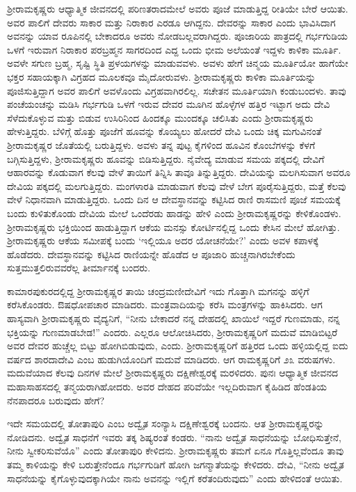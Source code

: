 ಶ‍್ರೀರಾಮಕೃಷ್ಣರು ಆಧ್ಯಾತ್ಮಿಕ ಜೀವನದಲ್ಲಿ ಪರಿಣತರಾದಮೇಲೆ ಅವರು ಪೂಜೆ ಮಾಡುತ್ತಿದ್ದ ರೀತಿಯೇ ಬೇರೆ ಆಯಿತು. ಅವರ ಪಾಲಿಗೆ ದೇವರು ಸಾಕಾರ ಮತ್ತು ನಿರಾಕಾರ ಎರಡೂ ಆಗಿದ್ದನು. ದೇವರನ್ನು ಸಾಕಾರ ಎಂದು ಭಾವಿಸಿದಾಗ ಅವನನ್ನು ಯಾವ ರೂಪಿನಲ್ಲಿ ಬೇಕಾದರೂ ಅವರು ನೋಡಬಲ್ಲವರಾಗಿದ್ದರು. ಪೂಜಾರಿಯ ಪಾತ್ರದಲ್ಲಿ ಗರ್ಭಗುಡಿಯ ಒಳಗೆ ಇರುವಾಗ ನಿರಾಕಾರ ಪರಬ್ರಹ್ಮನ ಸಾಗರದಿಂದ ಎದ್ದ ಒಂದು ಭೀಮ ಅಲೆಯಂತೆ ಇದ್ದಳು ಕಾಳಿಕಾ ಮೂರ್ತಿ. ಅವಳೇ ಸಗುಣ ಬ್ರಹ್ಮ, ಸೃಷ್ಟಿ ಸ್ಥಿತಿ ಪ್ರಳಯಗಳನ್ನು ಮಾಡುವವಳು. ಅವಳು ಹೇಗೆ ಚಿನ್ಮಯ ಮೂರ್ತಿಯೋ ಹಾಗೆಯೇ ಭಕ್ತರ ಸಹಾಯಕ್ಕಾಗಿ ವಿಗ್ರಹದ ಮೂಲಕವೂ ಮೈದೋರುವಳು. ಶ‍್ರೀರಾಮಕೃಷ್ಣರು ಕಾಳಿಕಾ ಮೂರ್ತಿಯನ್ನು ಪೂಜಿಸುತ್ತಿದ್ದಾಗ ಅವರ ಪಾಲಿಗೆ ಅವಳೊಂದು ವಿಗ್ರಹವಾಗಿರಲಿಲ್ಲ. ಸಚೇತನ ಮೂರ್ತಿಯಾಗಿ ಕಂಡುಬಂದಳು. ತಾವು ಪಂಚೆಯಂಚನ್ನು ಮಡಿಸಿ ಗರ್ಭಗುಡಿ ಒಳಗೆ ಇರುವ ದೇವರ ಮೂಗಿನ ಹೊಳ್ಳೆಗಳ ಹತ್ತಿರ ಇಟ್ಟಾಗ ಅದು ದೇವಿ ಸೆಳೆದುಕೊಳ್ಳುವ ಮತ್ತು ಬಿಡುವ ಉಸಿರಿನಿಂದ ಹಿಂದಕ್ಕೂ ಮುಂದಕ್ಕೂ ಚಲಿಸಿತು ಎಂದು ಶ‍್ರೀರಾಮಕೃಷ್ಣರು ಹೇಳುತ್ತಿದ್ದರು. ಬೆಳಿಗ್ಗೆ ಹೊತ್ತು ಪೂಜೆಗೆ ಹೂವನ್ನು ಕೊಯ್ಯಲು ಹೋದರೆ ದೇವಿ ಒಂದು ಚಿಕ್ಕ ಮಗುವಿನಂತೆ ಶ‍್ರೀರಾಮಕೃಷ್ಣರ ಜೊತೆಯಲ್ಲಿ ಬರುತ್ತಿದ್ದಳು. ಅವಳು ತನ್ನ ಪುಟ್ಟ ಕೈಗಳಿಂದ ಹೂವಿನ ಕೊಂಬೆಗಳನ್ನು ಕೆಳಗೆ ಬಗ್ಗಿಸುತ್ತಿದ್ದಳು, ಶ‍್ರೀರಾಮಕೃಷ್ಣರು ಹೂವನ್ನು ಬಿಡಿಸುತ್ತಿದ್ದರು. ನೈವೇದ್ಯ ಮಾಡುವ ಸಮಯ ಪಕ್ಕದಲ್ಲಿ ದೇವಿಗೆ ಆಹಾರವನ್ನು ಕೊಡುವಾಗ ಕೆಲವು ವೇಳೆ ತಾಯಿಗೆ ತಿನ್ನಿಸಿ ತಾವೂ ತಿನ್ನುತ್ತಿದ್ದರು. ದೇವಿಯನ್ನು ಮಲಗಿಸುವಾಗ ಅವರೂ ದೇವಿಯ ಪಕ್ಕದಲ್ಲಿ ಮಲಗುತ್ತಿದ್ದರು. ಮಂಗಳಾರತಿ ಮಾಡುವಾಗ ಕೆಲವು ವೇಳೆ ಬೇಗ ಪೂರೈಸುತ್ತಿದ್ದರು, ಮತ್ತೆ ಕೆಲವು ವೇಳೆ ನಿಧಾನವಾಗಿ ಮಾಡುತ್ತಿದ್ದರು. ಒಂದು ದಿನ ಆ ದೇವಸ್ಥಾನವನ್ನು ಕಟ್ಟಿಸಿದ ರಾಣಿ ರಾಸಮಣಿ ಪೂಜೆ ಸಮಯಕ್ಕೆ ಬಂದು ಕುಳಿತುಕೊಂಡು ದೇವಿಯ ಮೇಲೆ ಒಂದೆರಡು ಹಾಡನ್ನು ಹೇಳಿ ಎಂದು ಶ‍್ರೀರಾಮಕೃಷ್ಣರನ್ನು ಕೇಳಿಕೊಂಡಳು. ಶ‍್ರೀರಾಮಕೃಷ್ಣರು ಭಕ್ತಿಯಿಂದ ಹಾಡುತ್ತಿದ್ದಾಗ ಆಕೆಯ ಮನಸ್ಸು ಕೋರ್ಟಿನಲ್ಲಿದ್ದ ಒಂದು ಕೇಸಿನ ಮೇಲೆ ಹೋಗಿತ್ತು. ಶ‍್ರೀರಾಮಕೃಷ್ಣರು ಆಕೆಯ ಸಮೀಪಕ್ಕೆ ಬಂದು ‘ಇಲ್ಲಿಯೂ ಅದರ ಯೋಚನೆಯೇ?’ ಎಂದು ಅವಳ ಕಪಾಳಕ್ಕೆ ಹೊಡೆದರು. ದೇವಸ್ಥಾನವನ್ನು ಕಟ್ಟಿಸಿದ ರಾಣಿಯನ್ನೇ ಹೊಡೆದ ಆ ಪೂಜಾರಿ ಹುಚ್ಚನಾಗಿರಬೇಕೆಂದು ಸುತ್ತಮುತ್ತಲಿರುವವರೆಲ್ಲ ತೀರ್ಮಾನಕ್ಕೆ ಬಂದರು.

ಕಾಮಾರಪುಕುರದಲ್ಲಿದ್ದ ಶ‍್ರೀರಾಮಕೃಷ್ಣರ ತಾಯಿ ಚಂದ್ರಮಣೀದೇವಿಗೆ ಇದು ಗೊತ್ತಾಗಿ ಮಗನನ್ನು ಹಳ್ಳಿಗೆ ಕರೆಸಿಕೊಂಡರು. ಔಷಧೋಪಚಾರ ಮಾಡಿದರು. ಮಂತ್ರವಾದಿಯನ್ನು ಕರೆಸಿ ಮಂತ್ರಗಳನ್ನು ಹಾಕಿಸಿದರು. ಆಗ ಹಾಸ್ಯವಾಗಿ ಶ‍್ರೀರಾಮಕೃಷ್ಣರು ವೈದ್ಯನಿಗೆ, “ನೀನು ಬೇಕಾದರೆ ನನ್ನ ದೇಹದಲ್ಲಿ ಖಾಯಿಲೆ ಇದ್ದರೆ ಗುಣಮಾಡು, ನನ್ನ ಭಕ್ತಿಯನ್ನು ಗುಣಮಾಡಬೇಡ!” ಎಂದರು. ಎಲ್ಲರೂ ಆಲೋಚಿಸಿದರು, ಶ‍್ರೀರಾಮಕೃಷ್ಣರಿಗೆ ಮದುವೆ ಮಾಡಿಬಿಟ್ಟರೆ ಅವರ ದೇವರ ಹುಚ್ಚೆಲ್ಲ ಬಿಟ್ಟು ಹೋಗಿಬಿಡುವುದು, ಎಂದು. ಶ‍್ರೀರಾಮಕೃಷ್ಣರಿಗೆ ಹತ್ತಿರದ ಒಂದು ಹಳ್ಳಿಯಲ್ಲಿದ್ದ ಐದು ವರ್ಷದ ಶಾರದಾದೇವಿ ಎಂಬ ಹುಡುಗಿಯೊಂದಿಗೆ ಮದುವೆ ಮಾಡಿದರು. ಆಗ ರಾಮಕೃಷ್ಣರಿಗೆ ೨೩ ವರುಷಗಳು. ಮದುವೆಯಾದ ಕೆಲವು ದಿನಗಳ ಮೇಲೆ ಶ‍್ರೀರಾಮಕೃಷ್ಣರು ದಕ್ಷಿಣೇಶ್ವರಕ್ಕೆ ಮರಳಿದರು. ಪುನಃ ಆಧ್ಯಾತ್ಮಿಕ ಜೀವನದ ಮಹಾಸಾಹಸದಲ್ಲಿ ತನ್ಮಯರಾಗಿಹೋದರು. ಅವರ ದೇಹದ ಪರಿವೆಯೇ ಇಲ್ಲದಿರುವಾಗ ಕೈಹಿಡಿದ ಹೆಂಡತಿಯ ನೆನಪಾದರೂ ಬರುವುದು ಹೇಗೆ?

ಇದೇ ಸಮಯದಲ್ಲಿ ತೋತಾಪುರಿ ಎಂಬ ಅದ್ವೈತ ಸಂನ್ಯಾಸಿ ದಕ್ಷಿಣೇಶ್ವರಕ್ಕೆ ಬಂದನು. ಆತ ಶ‍್ರೀರಾಮಕೃಷ್ಣರನ್ನು ನೋಡಿದನು. ಅದ್ವೈತ ಸಾಧನೆಗೆ ಇವರು ತಕ್ಕ ಶಿಷ್ಯರಂತೆ ಕಂಡರು. “ನಾನು ಅದ್ವೈತ ಸಾಧನೆಯನ್ನು ಬೋಧಿಸುತ್ತೇನೆ, ನೀನು ಸ್ವೀಕರಿಸುವೆಯೊ” ಎಂದು ತೋತಾಪುರಿ ಕೇಳಿದನು. ಶ‍್ರೀರಾಮಕೃಷ್ಣರು ತಮಗೆ ಏನೂ ಗೊತ್ತಿಲ್ಲವೆಂದೂ ತಾವು ತಮ್ಮ ಕಾಳಿಯನ್ನು ಕೇಳಿ ಬರುತ್ತೇನೆಂದೂ ಗರ್ಭಗುಡಿಗೆ ಹೋಗಿ ಜಗನ್ಮಾತೆಯನ್ನು ಕೇಳಿದರು. ದೇವಿ, “ನೀನು ಅದ್ವೈತ ಸಾಧನೆಯನ್ನು ಕೈಗೊಳ್ಳುವುದಕ್ಕಾಗಿಯೇ ನಾನು ಅವನನ್ನು ಇಲ್ಲಿಗೆ ಕರೆತಂದಿರುವುದು” ಎಂದು ಹೇಳಿದಂತೆ ಆಯಿತು.

